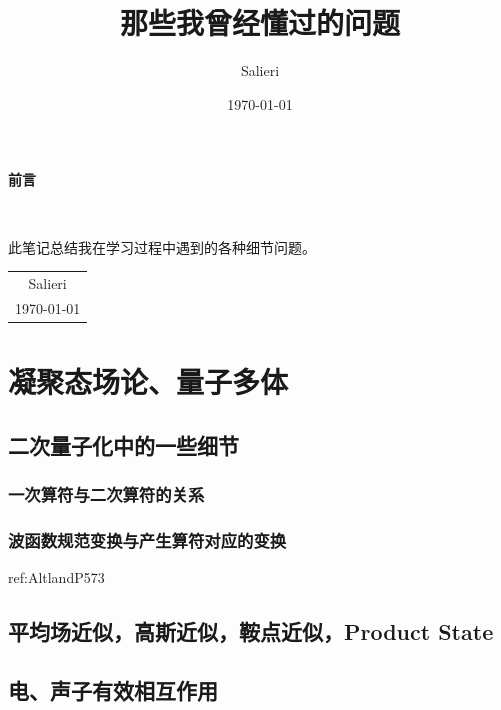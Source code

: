\documentclass[12pt, a4paper, oneside]{ctexbook}
\title{{\Huge{\textbf{那些我曾经懂过的问题}}}\\}
\author{Salieri}
\date{\today}
\begin{document}
	\maketitle
	
	\setcounter{page}{1}
	
	\begin{center}
		\Huge\textbf{前言}
	\end{center}~\
	
	此笔记总结我在学习过程中遇到的各种细节问题。
	~\\
	\begin{flushright}
		\begin{tabular}{c}
			Salieri\\
			\today
		\end{tabular}
	\end{flushright}
	
	\newpage
	\setcounter{page}{1}
	\tableofcontents
	\newpage
	\setcounter{page}{1}
	\chapter{凝聚态场论、量子多体}
	\section{二次量子化中的一些细节}
	\subsection{一次算符与二次算符的关系}
	\subsection{波函数规范变换与产生算符对应的变换}
	ref:AltlandP573
	\section{平均场近似，高斯近似，鞍点近似，Product State}
    \section{电、声子有效相互作用}
\end{document}
